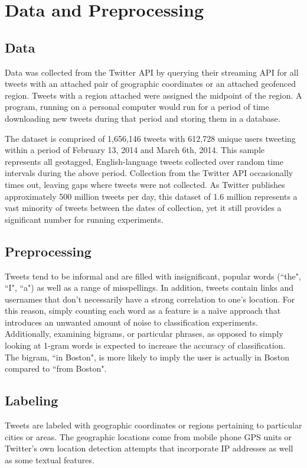\documentclass[midd]{thesis}
\begin{document}
\chapter{Data and Preprocessing}
\section{Data}

Data was collected from the Twitter API by querying their streaming API for all tweets with an attached pair of geographic coordinates or an attached geofenced region. Tweets with a region attached were assigned the midpoint of the region. A program, running on a personal computer would run for a period of time downloading new tweets during that period and storing them in a database. 

The dataset is comprised of 1,656,146 tweets with 612,728 unique users tweeting within a period of February 13, 2014 and March 6th, 2014. This sample represents all geotagged, English-language tweets collected over random time intervals during the above period. Collection from the Twitter API occasionally times out, leaving gaps where tweets were not collected. As Twitter publishes approximately 500 million tweets per day, this dataset of 1.6 million represents a vast minority of tweets between the dates of collection, yet it still provides a significant number for running experiments.

\section{Preprocessing}
Tweets tend to be informal and are filled with insignificant, popular words (``the", ``I", ``a") as well as a range of misspellings. In addition, tweets contain links and usernames that don't necessarily have a strong correlation to one's location. For this reason, simply counting each word as a feature is a naïve approach that introduces an unwanted amount of noise to classification experiments. Additionally, examining bigrams, or particular phrases, as opposed to simply looking at 1-gram words is expected to increase the accuracy of classification. The bigram, ``in Boston", is more likely to imply the user is actually in Boston compared to ``from Boston".

\section{Labeling}
Tweets are labeled with geographic coordinates or regions pertaining to particular cities or areas. The geographic locations come from mobile phone GPS units or Twitter's own location detection attempts that incorporate IP addresses as well as some textual features.
\end{document}
